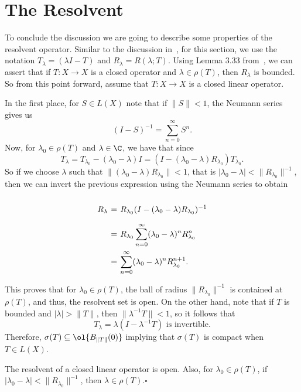 \section{The Resolvent}

To conclude the discussion we are going to describe some properties of the resolvent operator. Similar to the discussion in~\cite{taylor1986introduction}, for this section, we use the notation $T_\lambda = (\lambda I - T)$ and $R_\lambda = R(\lambda; T)$. Using Lemma 3.33 from~\cite{winklmeier2013functional}, we can assert that if $T:X\to X$ is a closed operator and $\lambda \in \rho(T)$, then $R_\lambda$ is bounded. So from this point forward, assume that $T: X \to X$ is a closed linear operator. 

In the first place, for $S \in L(X)$ note that if $\|S\| < 1$, the Neumann series gives us
\[ (I-S)^{-1} = \sum_{n = 0}^{\infty} S^n. \]
Now, for $\lambda_0 \in \rho(T)$ and $\lambda \in \C$, we have that since 
\[ T_{\lambda} = T_{\lambda_0} - (\lambda_0 - \lambda) I = (I - (\lambda_0-\lambda)R_{\lambda_0})T_{\lambda_0}. \]
So if we choose $\lambda$ such that $\|(\lambda_0-\lambda)R_{\lambda_0}\| < 1$, that is $|\lambda_0-\lambda|< \|R_{\lambda_0}\|^{-1}$, then we can invert the previous expression using the Neumann series to obtain
\[ \everymath{\displaystyle}
\arraycolsep=1.8pt\def\arraystretch{2.5}
\begin{array}{rcl}
    R_{\lambda} & = & R_{\lambda_0} (I - (\lambda_0-\lambda)R_{\lambda_0})^{-1}\\
    & = & R_{\lambda_0} \sum_{n = 0}^{\infty} (\lambda_0-\lambda)^n R_{\lambda_0}^n\\
    & = & \sum_{n = 0}^{\infty} (\lambda_0-\lambda)^n R_{\lambda_0}^{n+1}.
\end{array} \]

This proves that for $\lambda_0 \in \rho(T)$, the ball of radius $\|R_{\lambda_0}\|^{-1}$ is contained at $\rho(T)$, and thus, the resolvent set is open. On the other hand, note that if $T$ is bounded and $|\lambda| > \|T\|$, then $\|\lambda^{-1} T\| < 1$, so it follows that
\[ T_{\lambda} = \lambda(I - \lambda^{-1} T) \mbox{ is invertible.} \]
Therefore, $\sigma(T) \subseteq \ol{B_{\|T\|}(0)}$ implying that $\sigma(T)$ is compact when $T \in L(X)$. 

\begin{theorem}\label{thm:resolvent_is_open}
    The resolvent of a closed linear operator is open. Also, for $\lambda_0 \in \rho(T)$, if $|\lambda_0 - \lambda| < \|R_{\lambda_0}\|^{-1}$, then $\lambda \in \rho(T)$.\hfill $\square$
\end{theorem}


